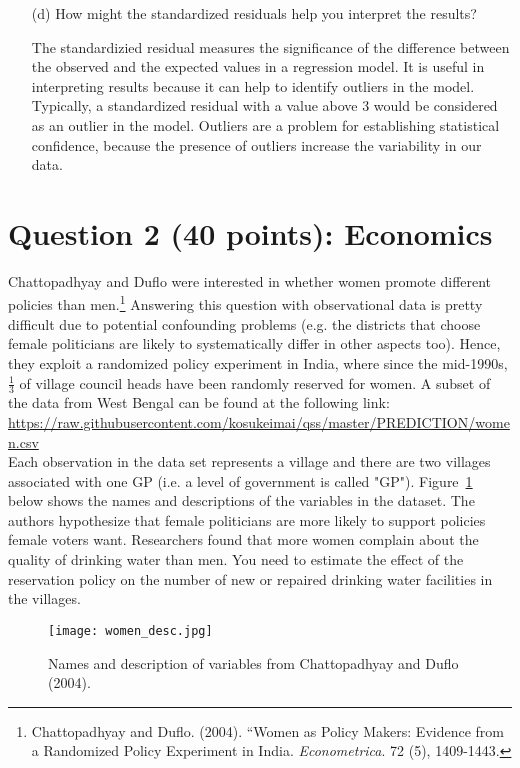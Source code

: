 \documentclass[12pt,letterpaper]{article}
\begin{document}
\begin{enumerate}
	
	\vspace{2cm}
	\item [(d)] How might the standardized residuals help you interpret the results?  
		\vspace{1cm}

The standardizied residual measures the significance of the difference between  the observed and the expected values in a regression model. It is useful in interpreting results because it can help to identify outliers in the model. Typically, a standardized residual with a value above 3 would be considered as an outlier in the model. Outliers are a problem for establishing statistical confidence, because the presence of outliers increase the variability in our data. 
	
\end{enumerate}
\newpage

\section*{Question 2 (40 points): Economics}
Chattopadhyay and Duflo were interested in whether women promote different policies than men.\footnote{Chattopadhyay and Duflo. (2004). ``Women as Policy Makers: Evidence from a Randomized Policy Experiment in India. \textit{Econometrica}. 72 (5), 1409-1443.} Answering this question with observational data is pretty difficult due to potential confounding problems (e.g. the districts that choose female politicians are likely to systematically differ in other aspects too). Hence, they exploit a randomized policy experiment in India, where since the mid-1990s, $\frac{1}{3}$ of village council heads have been randomly reserved for women. A subset of the data from West Bengal can be found at the following link: \url{https://raw.githubusercontent.com/kosukeimai/qss/master/PREDICTION/women.csv}\\

\noindent Each observation in the data set represents a village and there are two villages associated with one GP (i.e. a level of government is called "GP"). Figure~\ref{fig:women_desc} below shows the names and descriptions of the variables in the dataset. The authors hypothesize that female politicians are more likely to support policies female voters want. Researchers found that more women complain about the quality of drinking water than men. You need to estimate the effect of the reservation policy on the number of new or repaired drinking water facilities in the villages.
\vspace{.5cm}
\begin{figure}[h!]
	\caption{\footnotesize{Names and description of variables from Chattopadhyay and Duflo (2004).}}
	\vspace{.5cm}
	\centering
	\label{fig:women_desc}
	\texttt{[image: women\_desc.jpg]}
\end{figure}		
\end{document}
